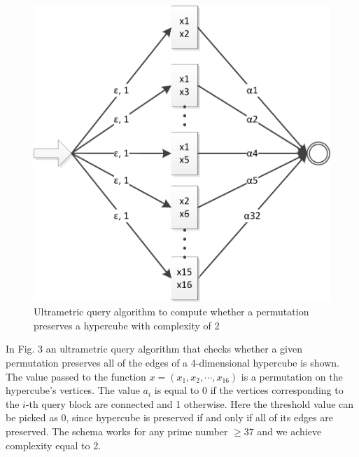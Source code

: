 \documentclass{llncs}
\begin{document}
\begin{figure}
	\centering
	\includegraphics{hypercube_2block.png}
	\caption{Ultrametric query algorithm to compute whether a permutation preserves a hypercube with complexity of 2}
	  \label{hyper2}
\end{figure}

In Fig. 3 an ultrametric query algorithm that checks whether a given permutation preserves all of the edges of a 4-dimensional hypercube is shown. The value passed to the function $x = (x_1, x_2, \cdots, x_{16})$ is a permutation on the hypercube's vertices. The value $a_i$ is equal to 0 if the vertices corresponding to the $i$-th query block are connected and 1 otherwise. Here the threshold value can be picked as 0, since hypercube is preserved if and only if all of its edges are preserved. The schema works for any prime number $\geq 37$ and we achieve complexity equal to 2.
\end{document}
